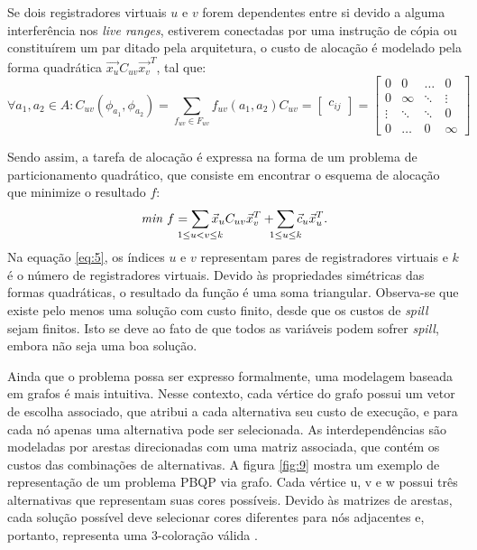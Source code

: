 \documentclass[
	12pt,				%
	openright,			%
	oneside,			%
	a4paper,			%
	tccpreliminar,			%
	]{ABNT-DC-UEL}
\begin{document}
Se dois registradores virtuais $u$ e $v$ forem dependentes entre si devido a alguma interferência nos \textit{live ranges}, estiverem conectadas por uma instrução de cópia ou constituírem um par ditado pela arquitetura, o custo de alocação é modelado pela forma quadrática $\Vec{x_u}C_{uv}\Vec{x_v}^T$, tal que:
\begin{subequations}
    \begin{equation}
        \forall a_1, a_2 \in A : C_{uv}(\phi_{a_1},\phi_{a_2}) = \sum_{f_{uv} \in F_{uv}} f_{uv}(a_1,a_2)
        \label{eq:3}
    \end{equation}
    \begin{equation}
        C_{uv} = \begin{bmatrix}
        c_{ij}
        \end{bmatrix} = \begin{bmatrix}
            0 & 0 & \ldots & 0 \\
            0 & \infty & \ddots & \vdots \\
            \vdots & \ddots & \ddots & 0 \\
            0 & \ldots & 0 & \infty
        \end{bmatrix}
        \label{eq:4}
    \end{equation}
\end{subequations}

Sendo assim, a tarefa de alocação é expressa na forma de um problema de particionamento quadrático, que consiste em encontrar o esquema de alocação que minimize o resultado $f$:
\begin{equation}
    \textit{min }f = \sum_{\mathclap{1 \leq u < v \leq k}} \Vec{x}_u C_{uv} \Vec{x}_v^T + \sum_{\mathclap{1 \leq u \leq k}} \Vec{c}_u \Vec{x}_u^T.
    \label{eq:5}
\end{equation}
Na equação \ref{eq:5}, os índices $u$ e $v$ representam pares de registradores virtuais e $k$ é o número de registradores virtuais. Devido às propriedades simétricas das formas quadráticas, o resultado da função é uma soma triangular. Observa-se que existe pelo menos uma solução com custo finito, desde que os custos de \textit{spill} sejam finitos. Isto se deve ao fato de que todos as variáveis podem sofrer \textit{spill}, embora não seja uma boa solução.

Ainda que o problema possa ser expresso formalmente, uma modelagem baseada em grafos é mais intuitiva. Nesse contexto, cada vértice do grafo possui um vetor de escolha associado, que atribui a cada alternativa seu custo de execução, e para cada nó apenas uma alternativa pode ser selecionada. As interdependências são modeladas por arestas direcionadas com uma matriz associada, que contém os custos das combinações de alternativas. A figura \ref{fig:9} mostra um exemplo de representação de um problema PBQP via grafo. Cada vértice u, v e w possui três alternativas que representam suas cores possíveis. Devido às matrizes de arestas, cada solução possível deve selecionar cores diferentes para nós adjacentes e, portanto, representa uma 3-coloração válida \cite{buchwald:11}.
\end{document}
